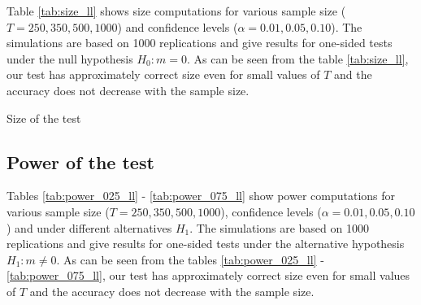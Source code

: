 Table \ref{tab:size_ll} shows size computations for various sample size ($T = 250, 350, 500, 1000$) and confidence levels ($\alpha = 0.01, 0.05, 0.10$). The simulations are based on 1000 replications and give results for one-sided tests under the null hypothesis $H_0: m=0$. As can be seen from the table \ref{tab:size_ll}, our test has approximately correct size even for small values of $T$ and the accuracy does not decrease with the sample size.
 
\begin{table}[H]
    \begin{center}
        \caption{Size of the test}
        \label{tab:size_ll}
        \centering
        
    \end{center}
\end{table}

\subsection{Power of the test}\label{subsec-sim-power}

Tables \ref{tab:power_025_ll} - \ref{tab:power_075_ll} show power computations for various sample size ($T = 250, 350, 500, 1000$), confidence levels ($\alpha = 0.01, 0.05, 0.10$) and under different alternatives $H_1$. The simulations are based on 1000 replications and give results for one-sided tests under the alternative hypothesis $H_1: m \ne 0$. As can be seen from the tables \ref{tab:power_025_ll} - \ref{tab:power_075_ll}, our test has approximately correct size even for small values of $T$ and the accuracy does not decrease with the sample size.


